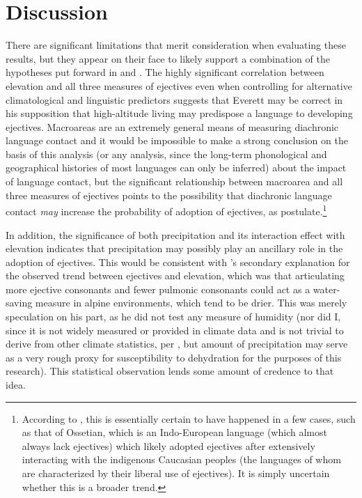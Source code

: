 \documentclass{article}
\begin{document}
\section{Discussion}
There are significant limitations that merit consideration when evaluating these results, but they appear on their face to likely support a combination of the hypotheses put forward in \textcite{everett2013} and \textcite{urban2021}. The highly significant correlation between elevation and all three measures of ejectives even when controlling for alternative climatological and linguistic predictors suggests that Everett may be correct in his supposition that high-altitude living may predispose a language to developing ejectives. Macroareas are an extremely general means of measuring diachronic language contact and it would be impossible to make a strong conclusion on the basis of this analysis (or any analysis, since the long-term phonological and geographical histories of most languages can only be inferred) about the impact of language contact, but the significant relationship between macroarea and all three measures of ejectives points to the possibility that diachronic language contact \emph{may} increase the probability of adoption of ejectives, as \textcite{urban2021} postulate.\footnote{According to \textcite{urban2021}, this is essentially certain to have happened in a few cases, such as that of Ossetian, which is an Indo-European language (which almost always lack ejectives) which likely adopted ejectives after extensively interacting with the indigenous Caucasian peoples (the languages of whom are characterized by their liberal use of ejectives). It is simply uncertain whether this is a broader trend.}

In addition, the significance of both precipitation and its interaction effect with elevation indicates that precipitation may possibly play an ancillary role in the adoption of ejectives. This would be consistent with \textcite{everett2013}'s secondary explanation for the observed trend between ejectives and elevation, which was that articulating more ejective consonants and fewer pulmonic consonants could act as a water-saving measure in alpine environments, which tend to be drier. This was merely speculation on his part, as he did not test any measure of humidity (nor did I, since it is not widely measured or provided in climate data and is not trivial to derive from other climate statistics, per \cite{eccel2012}, but amount of precipitation may serve as a very rough proxy for susceptibility to dehydration for the purposes of this research). This statistical observation lends some amount of credence to that idea.
\end{document}
